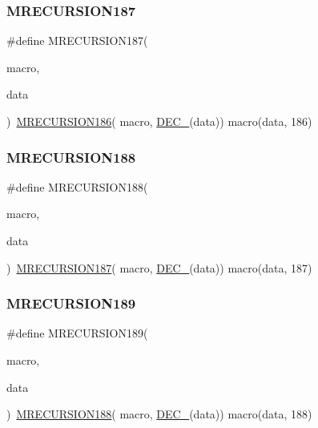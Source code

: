 \subsubsection{\texorpdfstring{MRECURSION187}{MRECURSION187}}
{\footnotesize\ttfamily \#define M\+R\+E\+C\+U\+R\+S\+I\+O\+N187(\begin{DoxyParamCaption}\item[{}]{macro,  }\item[{}]{data }\end{DoxyParamCaption})~\mbox{\hyperlink{group__group__sam0__utils__mrecursion_ga6f3d650ce8b765f93637e4a2e2b06db0}{M\+R\+E\+C\+U\+R\+S\+I\+O\+N186}}(  macro, \mbox{\hyperlink{group__group__sam0__utils__mrecursion_ga1d23d683797679dca8c3512a54a5dcae}{D\+E\+C\+\_\+}}(data))   macro(data, 186)}

\mbox{\label{group__group__sam0__utils__mrecursion_ga16bf5f92e153fe0044ed33ca46a5b259}} 
\subsubsection{\texorpdfstring{MRECURSION188}{MRECURSION188}}
{\footnotesize\ttfamily \#define M\+R\+E\+C\+U\+R\+S\+I\+O\+N188(\begin{DoxyParamCaption}\item[{}]{macro,  }\item[{}]{data }\end{DoxyParamCaption})~\mbox{\hyperlink{group__group__sam0__utils__mrecursion_gad8df14bd44a1a58706a68d4ee4c01b6e}{M\+R\+E\+C\+U\+R\+S\+I\+O\+N187}}(  macro, \mbox{\hyperlink{group__group__sam0__utils__mrecursion_ga1d23d683797679dca8c3512a54a5dcae}{D\+E\+C\+\_\+}}(data))   macro(data, 187)}

\mbox{\label{group__group__sam0__utils__mrecursion_ga5853c0c0f3dd91a6a68b624957e45b1f}} 
\subsubsection{\texorpdfstring{MRECURSION189}{MRECURSION189}}
{\footnotesize\ttfamily \#define M\+R\+E\+C\+U\+R\+S\+I\+O\+N189(\begin{DoxyParamCaption}\item[{}]{macro,  }\item[{}]{data }\end{DoxyParamCaption})~\mbox{\hyperlink{group__group__sam0__utils__mrecursion_ga16bf5f92e153fe0044ed33ca46a5b259}{M\+R\+E\+C\+U\+R\+S\+I\+O\+N188}}(  macro, \mbox{\hyperlink{group__group__sam0__utils__mrecursion_ga1d23d683797679dca8c3512a54a5dcae}{D\+E\+C\+\_\+}}(data))   macro(data, 188)}

